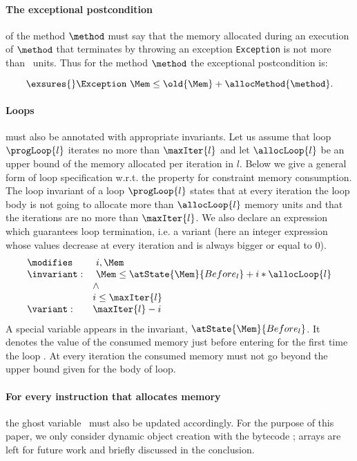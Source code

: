 \paragraph{The exceptional postcondition} of the method $\method$ must
say that the memory allocated during an execution of $\method$ that
terminates by throwing an exception \texttt{Exception} is not more
than \allocMethod{\method}\ units. Thus for the method $\method$ the
exceptional postcondition is:

$$
\exsures{} \Exception \  \Mem \leq \old{\Mem} + \allocMethod{\method}.
$$


\paragraph{Loops} must also be annotated with appropriate invariants. 
Let us assume that loop $\progLoop{l}$ iterates no more than $\maxIter{l}$ and let $\allocLoop{l}$ be an upper bound of the memory allocated per iteration in $l$.
Below we give a general form of loop specification w.r.t. the property for constraint memory consumption. The loop invariant of a loop $\progLoop{l}$ states that at every iteration the loop body is not going to allocate more than $\allocLoop{l}$ memory units and that the iterations are no more than $\maxIter{l}$. We also declare an expression which guarantees loop termination, i.e. a variant (here an integer expression whose values decrease at every iteration  and is always bigger or equal to 0).
$$\begin{array}{ll}
\modifies &  \ i, \Mem \\
\invariant: & \ \Mem \le \atState{\Mem}{Before_{l}} + i * \allocLoop{l} \\
                & \wedge \\
                & i \le \maxIter{l}\\
\variant: & \maxIter{l} - i \\
\end{array}$$
 A special variable appears in the invariant, $\atState{\Mem}{Before_{l}}$. It denotes the value of the consumed memory just before entering for the first time the loop . At every iteration the consumed memory must not go beyond the upper bound given for the body of loop.

\paragraph{For every instruction that allocates memory} the ghost
variable \Mem\ must also be updated accordingly. For the purpose of
this paper, we only consider dynamic object creation with the bytecode
\new; arrays are left for future work and briefly discussed in the
conclusion. 

